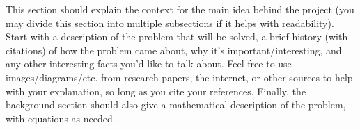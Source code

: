 This section should explain the context for the main idea behind the project (you may divide this section into multiple subsections if it helps with readability). Start with a description of the problem that will be solved, a brief history (with citations) of how the problem came about, why it’s important/interesting, and any other interesting facts you’d like to talk about. Feel free to use images/diagrams/etc. from research papers, the internet, or other sources to help with your explanation, so long as you cite your references. Finally, the background section should also give a mathematical description of the problem, with equations as needed.